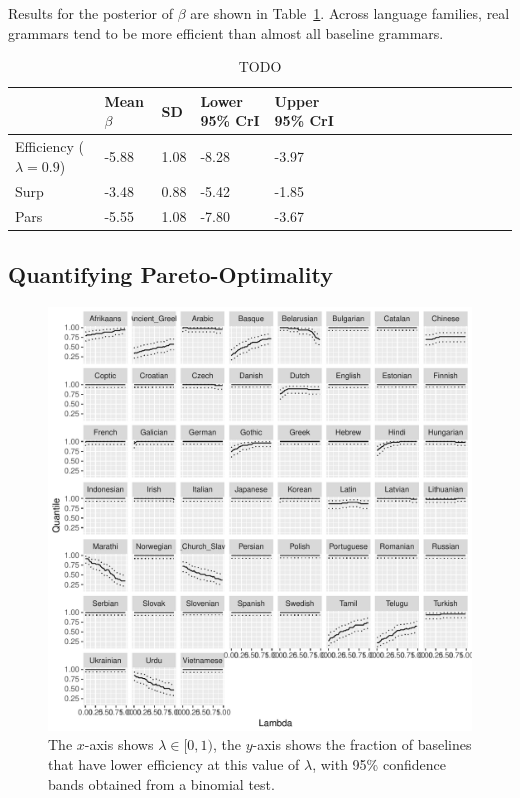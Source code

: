 \documentclass[10pt,twoside,lineno]{article}
\begin{document}
Results for the posterior of $\beta$ are shown in Table~\ref{tab:study1}.
Across language families, real grammars tend to be more efficient than almost all baseline grammars.

\begin{table}
\small{
\begin{center}
\begin{tabular}{|l||l|lll|llll|ll|llllll}
\hline
	& Mean $\beta$ & SD & Lower 95\% CrI & Upper 95\% CrI \\
\hline\hline
	Efficiency ($\lambda=0.9$) &	-5.88   &   1.08  &  -8.28  &  -3.97  \\
	Surp & -3.48   &   0.88  &  -5.42  &  -1.85   \\
	Pars & -5.55   &   1.08  &  -7.80  &  -3.67    \\
\hline
\end{tabular}
\end{center}
}
	\caption{TODO}\label{tab:study1}
\end{table}


\subsection{Quantifying Pareto-Optimality}

\begin{figure}
\centering
\includegraphics[width=\textwidth]{../results/plane/analyze_pareto_optimality/figures/quantileByLambda.pdf}
	\caption[]{The $x$-axis shows $\lambda \in [0,1)$, the $y$-axis shows the fraction of baselines that have lower efficiency at this value of $\lambda$, with 95\% confidence bands obtained from a binomial test.}\label{fig:lambda-quantile}
\end{figure}
\end{document}
